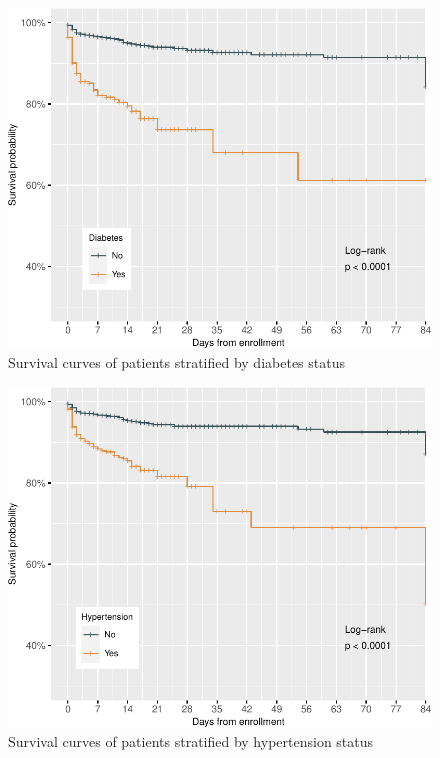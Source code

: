 \documentclass[
  10pt,
]{article}
\begin{document}
\newpage

\begin{figure}[h]

{\centering \includegraphics{results_files/figure-latex/diabetes-1} 

}

\caption{Survival curves of patients stratified by diabetes status}\label{fig:diabetes}
\end{figure}

\newpage

\begin{figure}[h]

{\centering \includegraphics{results_files/figure-latex/hypertension-1} 

}

\caption{Survival curves of patients stratified by hypertension status}\label{fig:hypertension}
\end{figure}
\end{document}
